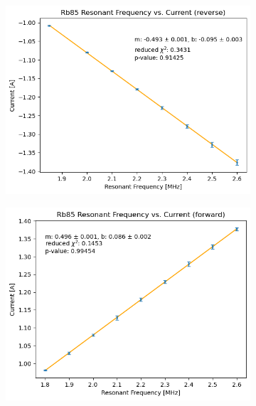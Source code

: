 \documentclass[10pt]{article}
\begin{document}
	\begin{figure}
		\centering
		\begin{subfigure}{0.4\textwidth}
			\includegraphics[scale=0.4]{images/rb85-neg.png}
			\caption{}
		\end{subfigure}
		\begin{subfigure}{0.4\textwidth}
			\includegraphics[scale=0.4]{images/rb85-pos.png}
			\caption{}
		\end{subfigure}
		\begin{subfigure}{0.4\textwidth}

\end{subfigure}
\end{figure}
\end{document}

